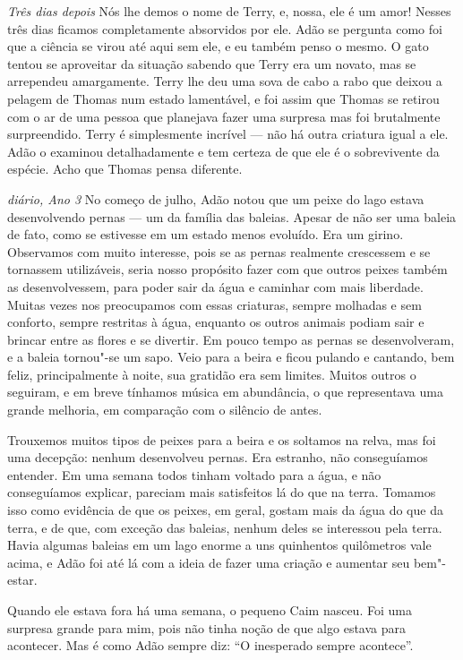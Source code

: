 \textit{Três dias depois} Nós lhe demos o nome de Terry, e, nossa, ele é um amor! 
Nesses três dias ficamos completamente absorvidos por ele.
Adão se pergunta como foi que a ciência se virou até aqui sem ele, e eu também
penso o mesmo. O gato tentou se aproveitar da situação sabendo que Terry era um
novato, mas se arrependeu amargamente. Terry lhe deu uma sova de cabo a rabo que
deixou a pelagem de Thomas num estado lamentável, e foi assim que Thomas se retirou com o ar de uma pessoa que
planejava fazer uma surpresa mas foi brutalmente surpreendido. Terry
é simplesmente incrível --- não há outra criatura igual a ele. Adão o examinou
detalhadamente e tem certeza de que ele é o sobrevivente da espécie. Acho que Thomas
pensa diferente.

\textit{diário, Ano 3} No começo de julho, Adão notou que um peixe do lago estava
desenvolvendo pernas --- um da família das baleias. Apesar de não ser uma
baleia de fato, como se estivesse em um estado menos evoluído. Era um girino.
Observamos com muito interesse, pois se as pernas realmente crescessem e se
tornassem utilizáveis, seria nosso propósito fazer com que outros peixes também as 
desenvolvessem, para poder sair da água e caminhar com mais liberdade.
Muitas vezes nos preocupamos com essas criaturas, sempre molhadas e sem conforto,
sempre restritas à água, enquanto os outros animais podiam sair e brincar entre
as flores e se divertir. Em pouco tempo as pernas se desenvolveram, e a baleia
tornou"-se um sapo. Veio para a beira e ficou pulando e cantando, bem feliz,
principalmente à noite, sua gratidão era sem limites. Muitos outros o seguiram, e
em breve tínhamos música em abundância, o que representava uma grande melhoria,
em comparação com o silêncio de antes.

Trouxemos muitos tipos de peixes para a beira e os soltamos na relva, mas foi uma
decepção: nenhum desenvolveu pernas. Era estranho, não conseguíamos entender.
Em uma semana todos tinham voltado para a água, e não conseguíamos explicar,
pareciam mais satisfeitos lá do que na terra. Tomamos isso como evidência de
que os peixes, em geral, gostam mais da água do que da terra, e de que, com exceção
das baleias, nenhum deles se interessou pela terra. Havia algumas baleias 
em um lago enorme a uns quinhentos quilômetros vale acima, e Adão foi até
lá com a ideia de fazer uma criação e aumentar seu bem"-estar.

Quando ele estava fora há uma semana, o pequeno Caim nasceu. Foi uma surpresa grande para
mim, pois não tinha noção de que algo estava para acontecer. Mas é como Adão sempre
diz: “O inesperado sempre acontece”.

